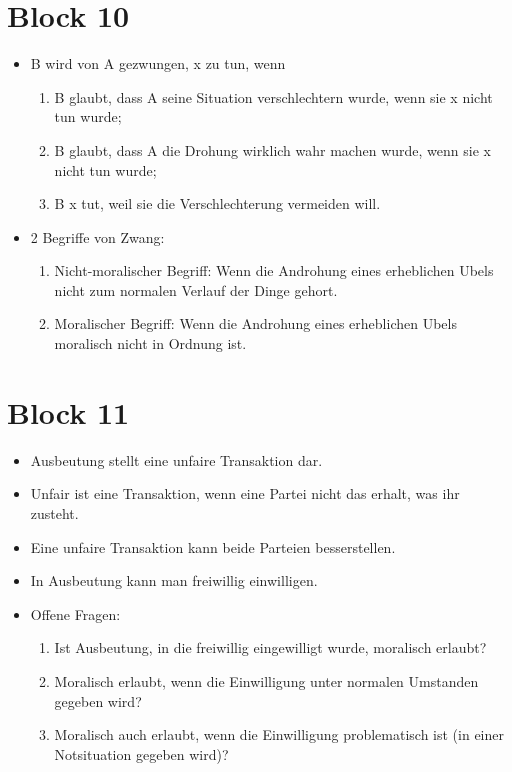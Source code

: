 \documentclass[../main.tex]{subfiles}
\begin{document}
\section{Block 10}
\begin{itemize}
	\item B wird von A gezwungen, x zu tun, wenn\begin{enumerate}[label=(\alph*)]
			\item B glaubt, dass A seine Situation verschlechtern wurde, wenn sie x nicht tun wurde;
			\item B glaubt, dass A die Drohung wirklich wahr machen wurde, wenn sie x nicht tun wurde;
			\item B x tut, weil sie die Verschlechterung vermeiden will.
		\end{enumerate}
	\item 2 Begriffe von Zwang: \begin{enumerate}[label=(\alph*)]
			\item Nicht-moralischer Begriff: Wenn die Androhung eines erheblichen Ubels nicht zum normalen Verlauf der Dinge gehort.
			\item Moralischer Begriff: Wenn die Androhung eines erheblichen Ubels moralisch nicht in Ordnung ist.
		\end{enumerate}
\end{itemize}

\section{Block 11}
\begin{itemize}
	\item Ausbeutung stellt eine unfaire Transaktion dar.
	\item Unfair ist eine Transaktion, wenn eine Partei nicht das erhalt, was ihr zusteht. 
	\item Eine unfaire Transaktion kann beide Parteien besserstellen.
	\item In Ausbeutung kann man freiwillig einwilligen.
 	\item Offene Fragen:\begin{enumerate}[label=(\alph*)]
			\item Ist Ausbeutung, in die freiwillig eingewilligt wurde, moralisch erlaubt?
			\item Moralisch erlaubt, wenn die Einwilligung unter normalen Umstanden gegeben wird?
			\item Moralisch auch erlaubt, wenn die Einwilligung problematisch ist (in einer Notsituation gegeben wird)? 
		\end{enumerate}
\end{itemize}
\end{document}
